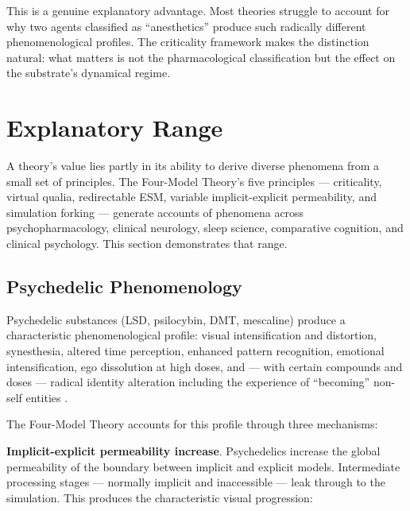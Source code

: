 \documentclass[12pt]{article}
\begin{document}
This is a genuine explanatory advantage. Most theories struggle to account for why two agents classified as ``anesthetics'' produce such radically different phenomenological profiles. The criticality framework makes the distinction natural: what matters is not the pharmacological classification but the effect on the substrate's dynamical regime.



\section{Explanatory Range}


A theory's value lies partly in its ability to derive diverse phenomena from a small set of principles. The Four-Model Theory's five principles --- criticality, virtual qualia, redirectable ESM, variable implicit-explicit permeability, and simulation forking --- generate accounts of phenomena across psychopharmacology, clinical neurology, sleep science, comparative cognition, and clinical psychology. This section demonstrates that range.


\subsection{Psychedelic Phenomenology}


Psychedelic substances (LSD, psilocybin, DMT, mescaline) produce a characteristic phenomenological profile: visual intensification and distortion, synesthesia, altered time perception, enhanced pattern recognition, emotional intensification, ego dissolution at high doses, and --- with certain compounds and doses --- radical identity alteration including the experience of ``becoming'' non-self entities \citep{CarhartHarris2012,CarhartHarris2016,Timmermann2019,Timmermann2023}.

The Four-Model Theory accounts for this profile through three mechanisms:

\textbf{Implicit-explicit permeability increase}. Psychedelics increase the global permeability of the boundary between implicit and explicit models. Intermediate processing stages --- normally implicit and inaccessible --- leak through to the simulation. This produces the characteristic visual progression:
\end{document}
